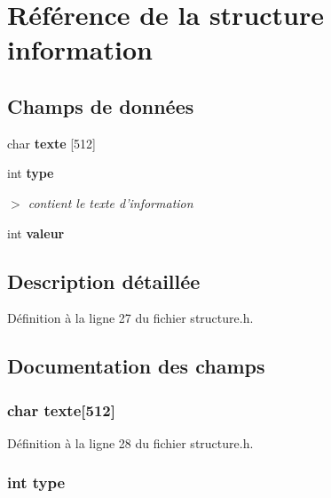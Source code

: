 \section{R\'{e}f\'{e}rence de la structure information}
\label{structinformation}
\subsection*{Champs de donn\'{e}es}
\begin{CompactItemize}
\item 
char {\bf texte} [512]
\item 
int {\bf type}
\begin{CompactList}\small\item\em $>$ contient le texte d'information \item\end{CompactList}\item 
int {\bf valeur}
\end{CompactItemize}


\subsection{Description d\'{e}taill\'{e}e}




D\'{e}finition \`{a} la ligne 27 du fichier structure.h.

\subsection{Documentation des champs}
\subsubsection{\setlength{\rightskip}{0pt plus 5cm}char {\bf texte}[512]}\label{structinformation_9c06d8d2b073bee34e1f7d22a2aeade4}




D\'{e}finition \`{a} la ligne 28 du fichier structure.h.
\subsubsection{\setlength{\rightskip}{0pt plus 5cm}int {\bf type}}\label{structinformation_c765329451135abec74c45e1897abf26}


